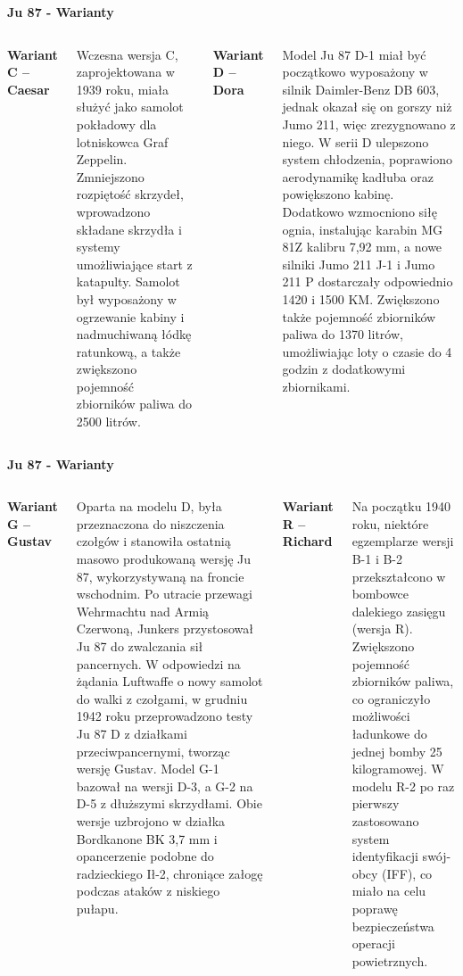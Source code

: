 \begin{frame}[t]{\Huge{\textbf{Ju 87 - Warianty}}}
	\begin{columns}[t]

{\large{\textbf{Wariant C – Caesar}}}
	\justifying

Wczesna wersja C, zaprojektowana w 1939 roku, miała służyć jako samolot pokładowy dla lotniskowca Graf Zeppelin. Zmniejszono rozpiętość skrzydeł, wprowadzono składane skrzydła i systemy umożliwiające start z katapulty. Samolot był wyposażony w ogrzewanie kabiny i nadmuchiwaną łódkę ratunkową, a także zwiększono pojemność zbiorników paliwa do 2500 litrów.

		
{\large{\textbf{Wariant D – Dora}}}
	\justifying

Model Ju 87 D-1 miał być początkowo wyposażony w silnik Daimler-Benz DB 603, jednak okazał się on gorszy niż Jumo 211, więc zrezygnowano z niego. W serii D ulepszono system chłodzenia, poprawiono aerodynamikę kadłuba oraz powiększono kabinę. Dodatkowo wzmocniono siłę ognia, instalując karabin MG 81Z kalibru 7,92 mm, a nowe silniki Jumo 211 J-1 i Jumo 211 P dostarczały odpowiednio 1420 i 1500 KM. Zwiększono także pojemność zbiorników paliwa do 1370 litrów, umożliwiając loty o czasie do 4 godzin z dodatkowymi zbiornikami.

	\end{columns}
\end{frame}


\begin{frame}[t]{\Huge{\textbf{Ju 87 - Warianty}}}
	\begin{columns}[t]

{\large{\textbf{Wariant G – Gustav}}}
	\justifying
	
Oparta na modelu D, była przeznaczona do niszczenia czołgów i stanowiła ostatnią masowo produkowaną wersję Ju 87, wykorzystywaną na froncie wschodnim. Po utracie przewagi Wehrmachtu nad Armią Czerwoną, Junkers przystosował Ju 87 do zwalczania sił pancernych. W odpowiedzi na żądania Luftwaffe o nowy samolot do walki z czołgami, w grudniu 1942 roku przeprowadzono testy Ju 87 D z działkami przeciwpancernymi, tworząc wersję Gustav. Model G-1 bazował na wersji D-3, a G-2 na D-5 z dłuższymi skrzydłami. Obie wersje uzbrojono w działka Bordkanone BK 3,7 mm i opancerzenie podobne do radzieckiego Ił-2, chroniące załogę podczas ataków z niskiego pułapu.

		
{\large{\textbf{Wariant R – Richard}}}
	\justifying
	
Na początku 1940 roku, niektóre egzemplarze wersji B-1 i B-2 przekształcono w bombowce dalekiego zasięgu (wersja R). Zwiększono pojemność zbiorników paliwa, co ograniczyło możliwości ładunkowe do jednej bomby 25 kilogramowej. W modelu R-2 po raz pierwszy zastosowano system identyfikacji swój-obcy (IFF), co miało na celu poprawę bezpieczeństwa operacji powietrznych.

	\end{columns}
\end{frame}